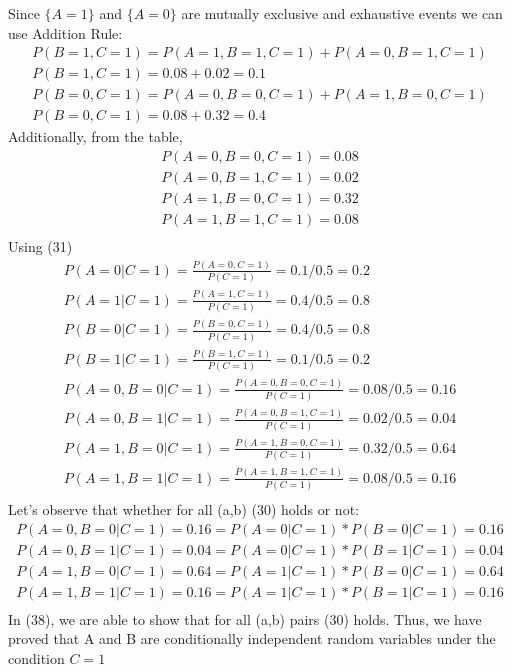 \documentclass[12pt]{article}
\begin{document}
Since $\{A=1\}$ and $\{A=0\}$ are mutually exclusive and exhaustive events we can use Addition Rule:
\begin{equation} 
\begin{split}
P(B=1,C=1) = P(A=1,B=1,C=1) + P(A=0,B=1,C=1) \\
P(B=1,C=1) = 0.08 + 0.02 = 0.1 \\
P(B=0,C=1) = P(A=0,B=0,C=1) + P(A=1,B=0,C=1) \\
P(B=0,C=1) = 0.08 + 0.32 = 0.4
\end{split}
\end{equation}
Additionally, from the table,
\begin{equation} 
\begin{split}
P(A=0,B=0,C=1) = 0.08 \\
P(A=0,B=1,C=1) = 0.02 \\
P(A=1,B=0,C=1) = 0.32 \\
P(A=1,B=1,C=1) = 0.08 \\
\end{split}
\end{equation}
Using (31)
\begin{equation} 
\begin{split}
P(A=0|C=1) = \frac{P(A=0,C=1)}{P(C=1)} = 0.1/0.5 = 0.2 \\
P(A=1|C=1) = \frac{P(A=1,C=1)}{P(C=1)} = 0.4/0.5 = 0.8\\
P(B=0|C=1) = \frac{P(B=0,C=1)}{P(C=1)} = 0.4/0.5 = 0.8\\
P(B=1|C=1) = \frac{P(B=1,C=1)}{P(C=1)} = 0.1/0.5 = 0.2\\
P(A=0,B=0|C=1) = \frac{P(A=0,B=0,C=1)}{P(C=1)} = 0.08/0.5 = 0.16\\
P(A=0,B=1|C=1) = \frac{P(A=0,B=1,C=1)}{P(C=1)} = 0.02/0.5 =0.04\\
P(A=1,B=0|C=1) = \frac{P(A=1,B=0,C=1)}{P(C=1)} =0.32/0.5 = 0.64 \\
P(A=1,B=1|C=1) = \frac{P(A=1,B=1,C=1)}{P(C=1)} =0.08/0.5 = 0.16\\
\end{split}
\end{equation}
Let's observe that whether for all (a,b) 
(30) holds or not:
\begin{equation} 
\begin{split}
P(A=0,B=0|C=1) = 0.16 = P(A=0|C=1)*P(B=0|C=1) = 0.16 \\
P(A=0,B=1|C=1) = 0.04 = P(A=0|C=1)*P(B=1|C=1) = 0.04 \\
P(A=1,B=0|C=1) = 0.64 = P(A=1|C=1)*P(B=0|C=1) = 0.64 \\
P(A=1,B=1|C=1) = 0.16 = P(A=1|C=1)*P(B=1|C=1) = 0.16 \\
\end{split}
\end{equation}
In (38), we are able to show that for all (a,b) pairs (30) holds. Thus, we have proved that A and B are conditionally independent random variables under the condition $C=1$
\end{document}
